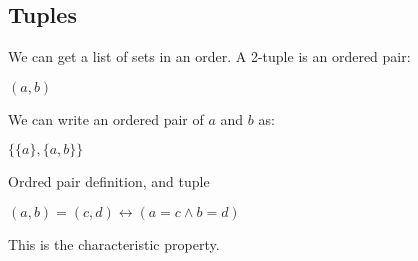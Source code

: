 
\subsection{Tuples}

We can get a list of sets in an order. A 2-tuple is an ordered pair:

\((a, b)\)

We can write an ordered pair of \(a\) and \(b\) as:

\(\{\{a\},\{a,b\}\}\)

Ordred pair definition, and tuple

\((a,b)=(c,d) \leftrightarrow (a=c\land b=d)\)

This is the characteristic property.

